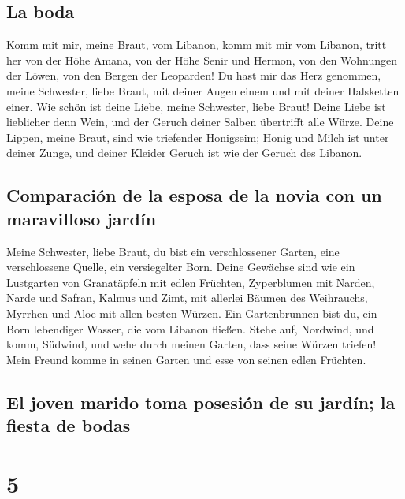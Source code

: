 \hypertarget{la-boda}{%
\subsection{La boda}\label{la-boda}}

 Komm mit mir, meine Braut, vom Libanon, komm mit mir vom
Libanon, tritt her von der Höhe Amana, von der Höhe Senir und Hermon,
von den Wohnungen der Löwen, von den Bergen der Leoparden!
 Du hast mir das Herz genommen, meine Schwester, liebe
Braut, mit deiner Augen einem und mit deiner Halsketten einer.
 Wie schön ist deine Liebe, meine Schwester, liebe Braut!
Deine Liebe ist lieblicher denn Wein, und der Geruch deiner Salben
übertrifft alle Würze.  Deine Lippen, meine Braut, sind
wie triefender Honigseim; Honig und Milch ist unter deiner Zunge, und
deiner Kleider Geruch ist wie der Geruch des Libanon.

\hypertarget{comparaciuxf3n-de-la-esposa-de-la-novia-con-un-maravilloso-jarduxedn}{%
\subsection{Comparación de la esposa de la novia con un maravilloso
jardín}\label{comparaciuxf3n-de-la-esposa-de-la-novia-con-un-maravilloso-jarduxedn}}

 Meine Schwester, liebe Braut, du bist ein verschlossener
Garten, eine verschlossene Quelle, ein versiegelter Born.
 Deine Gewächse sind wie ein Lustgarten von Granatäpfeln
mit edlen Früchten, Zyperblumen mit Narden,  Narde und
Safran, Kalmus und Zimt, mit allerlei Bäumen des Weihrauchs, Myrrhen und
Aloe mit allen besten Würzen.  Ein Gartenbrunnen bist du,
ein Born lebendiger Wasser, die vom Libanon fließen. 
Stehe auf, Nordwind, und komm, Südwind, und wehe durch meinen Garten,
dass seine Würzen triefen! Mein Freund komme in seinen Garten und esse
von seinen edlen Früchten.

\hypertarget{el-joven-marido-toma-posesiuxf3n-de-su-jarduxedn-la-fiesta-de-bodas}{%
\subsection{El joven marido toma posesión de su jardín; la fiesta de
bodas}\label{el-joven-marido-toma-posesiuxf3n-de-su-jarduxedn-la-fiesta-de-bodas}}

\hypertarget{section-4}{%
\section{5}\label{section-4}}

